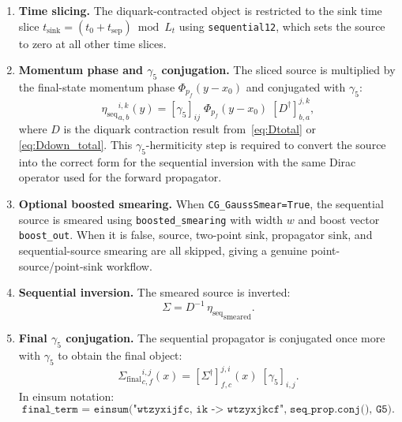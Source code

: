 \documentclass[11pt,a4paper]{article}
\newcommand{\seqsrc}{\eta_{\text{seq}}}
\newcommand{\seqprop}{\Sigma}
\newcommand{\xsrc}{x_{0}}
\newcommand{\xsink}{y}
\newcommand{\pfinal}{p_{f}}
\begin{document}
\begin{enumerate}
  \item \textbf{Time slicing.}  The diquark-contracted object is restricted to
        the sink time slice $t_{\text{sink}} = (t_{0} + t_{\text{sep}}) \bmod L_{t}$
        using \texttt{sequential12}, which sets the source to zero at all other
        time slices.

  \item \textbf{Momentum phase and $\gamma_{5}$ conjugation.}  The sliced source
        is multiplied by the final-state momentum phase
        $\Phi_{\pfinal}(\xsink-\xsrc)$ and conjugated with $\gamma_{5}$:
        \begin{equation}
          {\seqsrc}^{i,k}_{a,b}(\xsink)
          = [\gamma_{5}]_{ij}\;
            \Phi_{\pfinal}(\xsink-\xsrc)\;
            [D^{\dagger}]^{j,k}_{b,a},
        \end{equation}
        where $D$ is the diquark contraction result from~\eqref{eq:Dtotal} or
        \eqref{eq:Ddown_total}.  This $\gamma_{5}$-hermiticity step is required
        to convert the source into the correct form for the sequential inversion
        with the same Dirac operator used for the forward propagator.

  \item \textbf{Optional boosted smearing.}  When
        \texttt{CG\_GaussSmear=True}, the sequential source is smeared using
        \texttt{boosted\_smearing} with width $w$ and boost vector
        \texttt{boost\_out}.  When it is false, source, two-point sink,
        propagator sink, and sequential-source smearing are all skipped, giving
        a genuine point-source/point-sink workflow.

  \item \textbf{Sequential inversion.}  The smeared source is inverted:
        \begin{equation}
          \seqprop = D^{-1}\,{\seqsrc}_{\text{smeared}}.
        \end{equation}

  \item \textbf{Final $\gamma_{5}$ conjugation.}  The sequential propagator is
        conjugated once more with $\gamma_{5}$ to obtain the final object:
        \begin{equation}
          {\seqprop_{\text{final}}}^{i,j}_{c,f}(x)
          = [\seqprop^{\dagger}]^{j,i}_{f,c}(x)\;[\gamma_{5}]_{i,j}.
        \end{equation}
        In einsum notation:
        \begin{equation}
          \texttt{final\_term = einsum("wtzyxijfc, ik -> wtzyxjkcf",}
          \;\texttt{seq\_prop.conj(), G5)}.
        \end{equation}
\end{enumerate}
\end{document}
